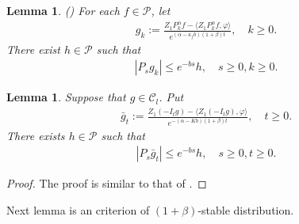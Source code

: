 \documentclass[12pt,a4paper]{amsart}
\theoremstyle{plain}
\newtheorem{lem}[thm]{Lemma}
\theoremstyle{definition}
\numberwithin{equation}{section}
\begin{document}
\begin{lem}\label{lem: control of gk}(\cite[Lemma 2.8]{MM})
    For each $f\in \mathcal{P}$, let
    \begin{align}
        g_k
    := \frac{Z_1 P^{\alpha}_k f-\langle  Z_1P^{\alpha}_k f,\varphi\rangle}{e^{(\alpha-\kappa_f b)(1+\beta)t}},
    \quad k \geq 0.
    \end{align}
    There exist $h\in \mathcal{P}$ such that
    \begin{align}
        |P_sg_k|\leq e^{-bs}h,\quad s\geq 0, k \geq 0.
    \end{align}
\end{lem}
\begin{lem}\label{control of gn} Suppose that $g\in \mathcal{C}_l$.
    Put
    \begin{align}
        \bar{g}_t:=\frac{Z_1(-I_tg)-\langle Z_1(-I_tg),\varphi\rangle}{e^{-(\alpha-Kb)(1+\beta)t}},\quad t\geq 0.
    \end{align}
    There exists $h\in \mathcal{P}$ such that
    \begin{align}
        |P_s\bar{g}_t|\leq e^{-bs}h,\quad s\geq 0, t\geq 0.
    \end{align}
\end{lem}
\begin{proof}
    The proof  is similar to that of \cite[Lemma 2.8]{MM}.
\end{proof}



Next lemma is an criterion of $(1+\beta)$-stable distribution.
\end{document}
